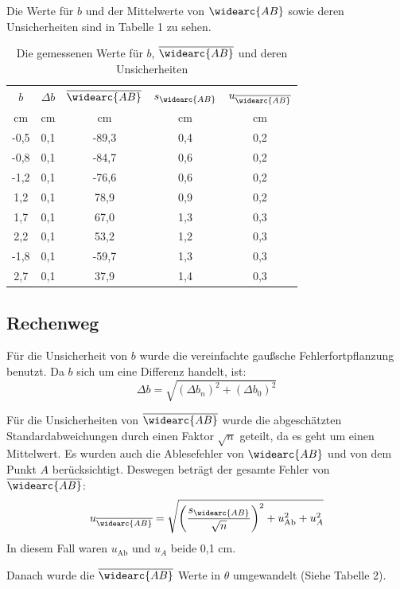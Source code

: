 \documentclass[11pt,a4paper]{article}
\begin{document}
Die Werte für $b$ und der Mittelwerte von $\widearc{AB}$ sowie deren Unsicherheiten sind in Tabelle 1 zu sehen.


\begin{table}[h]
	\centering
	\begin{tabular*}{0.50\textwidth}{@{\extracolsep{\fill}}ccccc}
		\toprule
		$b$ & $\Delta b$ & $\overline{\widearc{AB}}$ & $s_{\widearc{AB}}$ & $u_{\overline{\widearc{AB}}}$ \\
		cm & cm & cm &cm& cm\\
		\midrule
		-0,5 & 0,1 & -89,3 & 0,4 & 0,2\\
		-0,8 & 0,1 & -84,7 &0,6& 0,2\\
		-1,2 & 0,1 & -76,6 &0,6& 0,2\\
		1,2 & 0,1& 78,9 &0,9& 0,2 \\
		1,7 & 0,1 & 67,0 &1,3& 0,3 \\
		2,2 & 0,1 & 53,2 &1,2& 0,3 \\
		-1,8 & 0,1 & -59,7 &1,3& 0,3 \\
		2,7 & 0,1 & 37,9 &1,4& 0,3\\
		\bottomrule
\end{tabular*}
\caption{Die gemessenen Werte für $b$, $\overline{\widearc{AB}}$ und deren Unsicherheiten}
\end{table}

\begin{tcolorbox}[colback=white]
\subsection{Rechenweg}
Für die Unsicherheit von $b$ wurde die vereinfachte gaußsche Fehlerfortpflanzung benutzt. Da $b$ sich um eine Differenz handelt, ist:
$$\Delta b = \sqrt{(\Delta b_n)^2 + (\Delta b_0)^2}$$

Für die Unsicherheiten von $\overline{\widearc{AB}}$ wurde die abgeschätzten Standardabweichungen durch einen Faktor $\sqrt{n}$ geteilt, da es geht um einen Mittelwert. Es wurden auch die Ablesefehler von $\widearc{AB}$ und von dem Punkt $A$ berücksichtigt. Deswegen beträgt der gesamte Fehler von $\overline{\widearc{AB}}$:
$$
u_{\overline{\widearc{AB}}} = \sqrt{\left(\frac{s_{\widearc{AB}}}{\sqrt{n}}\right)^2+u_\textrm{Ab}^2+u_A^2}
$$
In diesem Fall waren $u_\textrm{Ab}$ und $u_A$ beide 0,1 cm.
\end{tcolorbox}

Danach wurde die $\overline{\widearc{AB}}$ Werte in $\theta$ umgewandelt (Siehe Tabelle 2).
\end{document}
